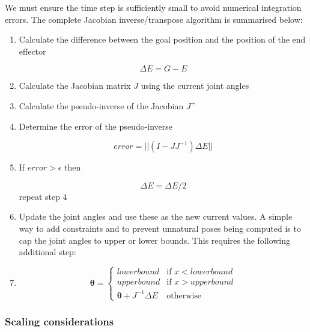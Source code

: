 \documentclass[paper=a4, fontsize=11pt]{scrartcl} %
\numberwithin{equation}{section} %
\numberwithin{figure}{section} %
\numberwithin{table}{section} %
\newcommand{\params}{\boldsymbol{\theta}}
\begin{document}
We must ensure the time step is sufficiently small to avoid numerical integration errors. The complete Jacobian inverse/transpose algorithm is summarised below:

\begin{enumerate}
\item
Calculate the difference between the goal position and the position of the end effector

\begin{equation}
\Delta E = G - E
\end{equation}

\item
Calculate the Jacobian matrix $J$ using the current joint angles

\item
Calculate the pseudo-inverse of the Jacobian $J^+$

\item
Determine the error of the pseudo-inverse

\begin{equation}
error = ||(I - JJ^{-1})\Delta E||
\end{equation}

\item
If $error > \epsilon$ then

\begin{equation}
\Delta E = \Delta E / 2
\end{equation}  
repeat step 4

\item
Update the joint angles and use these as the new current values.
A simple way to add constraints and to prevent unnatural poses being computed is to cap the joint angles to upper or lower bounds. This requires the following additional step:

\item
\begin{equation*}
\params = \left\{
\begin{array}{rl}
lowerbound & \text{if } x < lowerbound\\
upperbound & \text{if } x > upperbound\\
\params + J^{-1}\Delta E & \text{otherwise}
\end{array} \right.
\end{equation*}

\end{enumerate}

\subsubsection{Scaling considerations}
\end{document}

